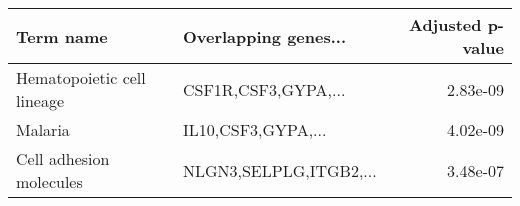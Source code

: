 \begin{tabular}{llr}
\toprule
                 Term name &   Overlapping genes... &  Adjusted p-value \\
\midrule
Hematopoietic cell lineage &    CSF1R,CSF3,GYPA,... &          2.83e-09 \\
                   Malaria &     IL10,CSF3,GYPA,... &          4.02e-09 \\
   Cell adhesion molecules & NLGN3,SELPLG,ITGB2,... &          3.48e-07 \\
\bottomrule
\end{tabular}
